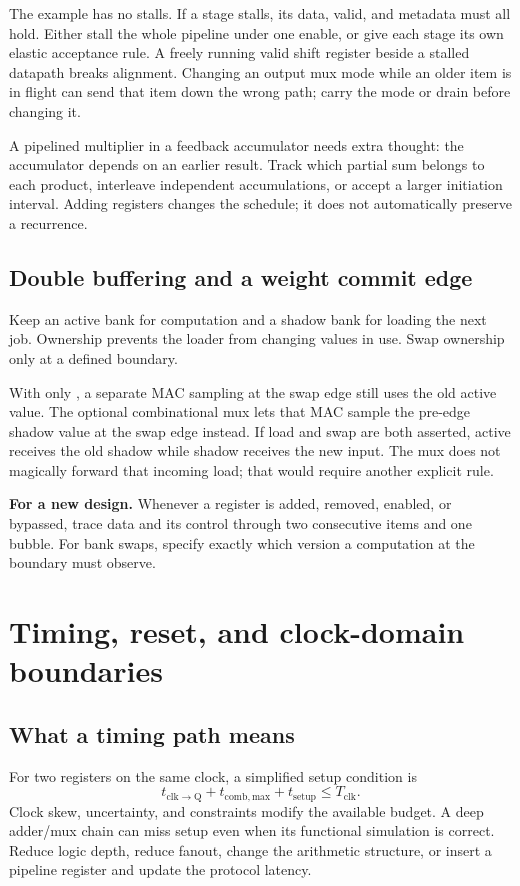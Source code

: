\documentclass[11pt]{article}
\newcommand{\cd}[1]{{\frenchspacing\texttt{\detokenize{#1}}}}
\newcommand{\svfile}[1]{\par\noindent\begin{minipage}{\linewidth}\end{minipage}\par}
\newcommand{\transfer}[1]{\par\textbf{For a new design.} #1\par}
\begin{document}
The example has no stalls. If a stage stalls, its data, valid, and metadata must all hold.
Either stall the whole pipeline under one enable, or give each stage its own elastic acceptance rule.
A freely running valid shift register beside a stalled datapath breaks alignment.
Changing an output mux mode while an older item is in flight can send that item down the wrong path; carry the mode or drain before changing it.

A pipelined multiplier in a feedback accumulator needs extra thought: the accumulator depends on an earlier result.
Track which partial sum belongs to each product, interleave independent accumulations, or accept a larger initiation interval.
Adding registers changes the schedule; it does not automatically preserve a recurrence.

\subsection{Double buffering and a weight commit edge}
Keep an active bank for computation and a shadow bank for loading the next job.
Ownership prevents the loader from changing values in use. Swap ownership only at a defined boundary.
\svfile{examples/weight_bank.sv}
With only \cd{active <= shadow}, a separate MAC sampling \cd{active} at the swap edge still uses the old active value.
The optional combinational \cd{selected} mux lets that MAC sample the pre-edge shadow value at the swap edge instead.
If load and swap are both asserted, active receives the old shadow while shadow receives the new input.
The mux does not magically forward that incoming load; that would require another explicit rule.
\transfer{Whenever a register is added, removed, enabled, or bypassed, trace data and its control through two consecutive items and one bubble.
For bank swaps, specify exactly which version a computation at the boundary must observe.}

\section{Timing, reset, and clock-domain boundaries}\label{sec:timing}
\subsection{What a timing path means}
For two registers on the same clock, a simplified setup condition is
\[
 t_{\mathrm{clk\to Q}}+t_{\mathrm{comb,max}}+t_{\mathrm{setup}}\leq T_{\mathrm{clk}}.
\]
Clock skew, uncertainty, and constraints modify the available budget.
A deep adder/mux chain can miss setup even when its functional simulation is correct.
Reduce logic depth, reduce fanout, change the arithmetic structure, or insert a pipeline register and update the protocol latency.
\end{document}
